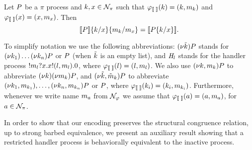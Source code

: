 \begin{corollary}\label{lem:encode-subst}
Let $P$ be a $\pi$ process and $k,x\in{\cal N}_\pi$ such that $\varphi_{\llbracket \; \rrbracket}(k)=(k, m_k)$ and $\varphi_{\llbracket \; \rrbracket}(x)=(x, m_x)$. Then 
\[
\enc{\PP}\subst{\NK}{\NX}\subst{\NM_\NK}{\NM_\NX}= \enc{\PP\subst{\NK}{\NX}}.%
\]
\end{corollary}



To simplify notation we use the following abbreviations: $(\nu \tilde{k})P$ stands for $(\nu k_1)\ldots(\nu k_n)P$ or $P$ (when $\tilde{k}$ is an empty list), and $\mathit{H}_l$ stands for the handler process $! m_l?x.x!(l,m_l).0$, where $\varphi_{\llbracket \; \rrbracket}(l)=(l, m_l)$. 
We also use $(\nu k,m_k)P$ to abbreviate $(\nu k)(\nu m_k)P$, and $(\nu \tilde{k}, \tilde{m}_k)P$ to abbreviate $(\nu k_1,m_{k_1}), \ldots, (\nu k_n, m_{k_n})P$ or $P$, where $\varphi_{\llbracket \; \rrbracket}(k_i)=(k_i, m_{k_i})$. Furthermore, whenever we write name $m_a$ from ${\cal N}_\varphi$ we assume that $\varphi_{\llbracket \; \rrbracket}(a)=(a, m_a)$, for $a\in{\cal N}_\pi$.

In order to show that our encoding preserves the structural congruence relation, up to strong barbed equivalence, 
we present an auxiliary result showing that a restricted handler process is behaviorally equivalent to the inactive process.


